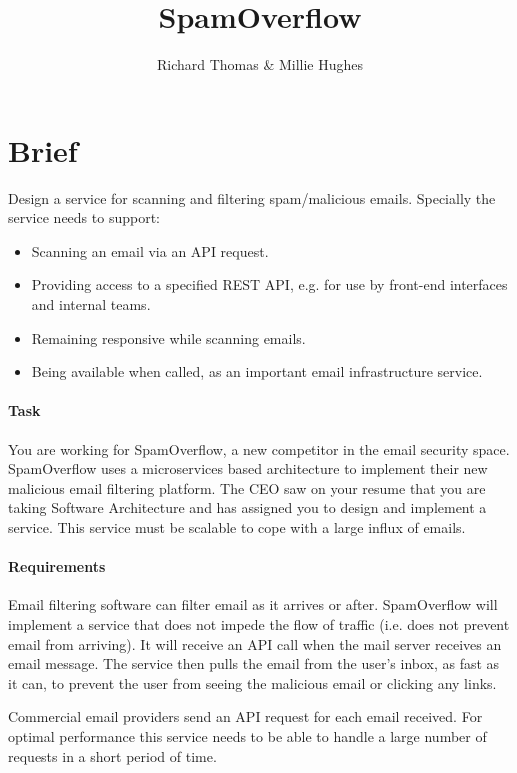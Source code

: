 \documentclass{csse4400}
\title{SpamOverflow}
\author{Richard Thomas \& Millie Hughes}
\date{\week[tutorial]{10}}
\begin{document}
\maketitle


\section{Brief}

Design a service for scanning and filtering spam/malicious emails.
Specially the service needs to support:
\begin{itemize}
    \item Scanning an email via an API request.
    \item Providing access to a specified REST API, e.g. for use by front-end interfaces and internal teams.
    \item Remaining responsive while scanning emails.
    \item Being available when called, as an important email infrastructure service.
\end{itemize}

\paragraph{Task}
You are working for SpamOverflow, a new competitor in the email security space.
Spam\-Overflow uses a microservices based architecture to implement their new malicious email filtering platform.
The CEO saw on your resume that you are taking Software Architecture
and has assigned you to design and implement a service.
This service must be scalable to cope with a large influx of emails.

\paragraph{Requirements}
Email filtering software can filter email as it arrives or after.
SpamOverflow will implement a service that does not impede the flow of traffic
(i.e. does not prevent email from arriving).
It will receive an API call when the mail server receives an email message.
The service then pulls the email from the user's inbox, as fast as it can,
to prevent the user from seeing the malicious email or clicking any links.

Commercial email providers send an API request for each email received.
For optimal performance this service needs to be able to handle a large number of requests in a short period of time.
\end{document}
